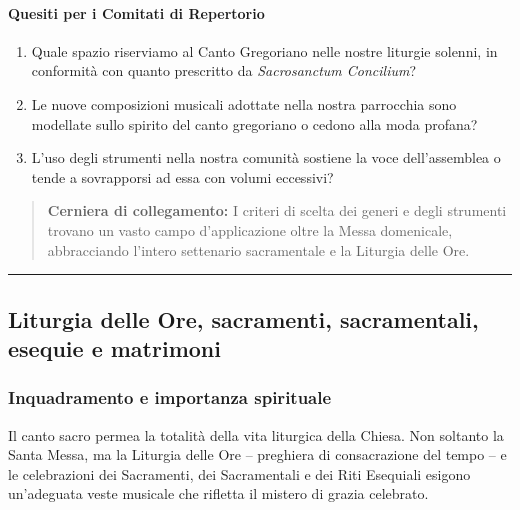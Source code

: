 \documentclass[12pt,a4paper]{article}
\begin{document}
	\paragraph{Quesiti per i Comitati di Repertorio}\label{quesiti-per-i-comitati-di-repertorio}
	
	\begin{enumerate}[label=\arabic*.,leftmargin=*]
		\item Quale spazio riserviamo al Canto Gregoriano nelle nostre liturgie solenni, in conformità con quanto prescritto da \emph{Sacrosanctum Concilium}?
		\item Le nuove composizioni musicali adottate nella nostra parrocchia sono modellate sullo spirito del canto gregoriano o cedono alla moda profana?
		\item L'uso degli strumenti nella nostra comunità sostiene la voce dell'assemblea o tende a sovrapporsi ad essa con volumi eccessivi?
	\end{enumerate}
	
	\begin{quote}
		\textbf{Cerniera di collegamento:} I criteri di scelta dei generi e degli strumenti trovano un vasto campo d'applicazione oltre la Messa domenicale, abbracciando l'intero settenario sacramentale e la Liturgia delle Ore.
	\end{quote}
	
	\begin{center}\rule{0.5\linewidth}{0.5pt}\end{center}
	
	\subsection{Liturgia delle Ore, sacramenti, sacramentali, esequie e matrimoni}\label{liturgia-delle-ore-sacramenti-sacramentali-esequie-e-matrimoni}
	
	\subsubsection{Inquadramento e importanza spirituale}\label{inquadramento-e-importanza-spirituale}
	
	Il canto sacro permea la totalità della vita liturgica della Chiesa. Non soltanto la Santa Messa, ma la Liturgia delle Ore -- preghiera di consacrazione del tempo -- e le celebrazioni dei Sacramenti, dei Sacramentali e dei Riti Esequiali esigono un'adeguata veste musicale che rifletta il mistero di grazia celebrato.
	
\end{document}
